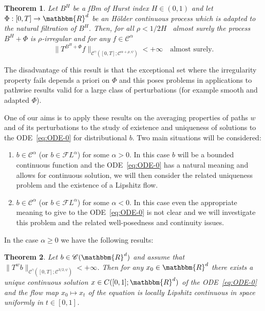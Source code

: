 \documentclass[a4paper,11pt]{article}
\newenvironment{enumeratenumeric}{\begin{enumerate}[1.] }{\end{enumerate}}
\newtheorem{theorem}{Theorem}[section]
\newcommand{\CC}{\mathscr C}
\newcommand{\CF}{\mathscr F}
\begin{document}
\begin{theorem}
  \label{th:perturbed-girsanov}Let $B^{H}$ be a fBm of Hurst index $H \in (
  0,1 )$ and let $\Phi : [ 0,T ] \rightarrow \mathbbm{R}^{d}$ be an Hölder
  continuous process which is adapted to the natural filtration of $B^H$. Then,
  for all $\rho <1/2H$ \ almost surely the process $B^H+ \Phi$ is
  $\rho$-irregular and for any $f \in \CC^{\alpha}$
  \[ \| T^{B^H+ \Phi}_{} f \|_{\CC^{\gamma} \left( [ 0,T ] ; \CC^{\alpha + \rho ,
     \psi} \right)} <+ \infty \quad \text{almost surely.}\]

\end{theorem}

The disadvantage of this result is that the exceptional set where the
irregularity property fails depends a priori on $\Phi$ and this poses problems
in applications to pathwise results valid for a large class of perturbations
(for example smooth and adapted $\Phi$).



One of our aims is to apply these results on the averaging properties of
paths $w$ and of its perturbations to the study of existence and uniqueness of
solutions to the ODE~{\eqref{eq:ODE-0}} for distributional $b$. Two main
situations will be considered:
\begin{enumeratenumeric}
  \item $b \in \CC^{\alpha}$ (or $b \in \CF L^{\alpha}$) for some $\alpha >0$.
  In this case $b$ will be a bounded continuous function and the
  ODE~{\eqref{eq:ODE-0}} has a natural meaning and allows for continuous
  solution, we will then consider the related uniqueness problem and the
  existence of a Lipshitz flow.
  
  \item $b \in \CC^{\alpha}$ (or $b \in \CF L^{\alpha}$) for some $\alpha <0$.
  In this case even the appropriate meaning to give to the
  ODE~{\eqref{eq:ODE-0}} is not clear and we will investigate this problem and
  the related well-posedness and continuity issues.
\end{enumeratenumeric}
In the case $\alpha \geqslant 0$ we have the following results:

\begin{theorem}
  \label{th:ode-flow-0}Let $b \in \CC ( \mathbbm{R}^{d} )$ and assume that
  $\|T^{w} b\|_{\CC^{\gamma} ( [ 0,T ] ; \CC^{3/2, \psi} )} <+ \infty$. Then for
  any $x_{0} \in \mathbbm{R}^{d}$ there exists a unique continuous solution $x
  \in C ([0,1];\mathbbm{R}^{d} )$ of the ODE~{\eqref{eq:ODE-0}} and the flow
  map $x_{0} \mapsto x_{t}$ of the equation is locally Lipshitz continuous in
  space uniformly in $t \in [0,1]$.
\end{theorem}
\end{document}
